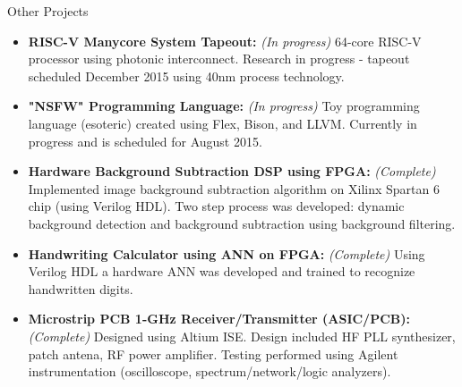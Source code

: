\begin{rSection}{Other Projects}
  \begin{itemize}
  \item {\bf RISC-V Manycore System Tapeout:} {\it (In progress)} 64-core RISC-V processor using photonic interconnect. Research in progress - tapeout scheduled December 2015 using 40nm process technology.
  \item {\bf "NSFW" Programming Language:} {\it (In progress)} Toy programming language (esoteric) created using Flex, Bison, and LLVM. Currently in progress and is scheduled for August 2015.
  \item {\bf Hardware Background Subtraction DSP using FPGA:} {\it (Complete)} Implemented image background subtraction algorithm on Xilinx Spartan 6 chip (using Verilog HDL). Two step process was developed: dynamic background detection and background subtraction using background filtering.
  \item {\bf Handwriting Calculator using ANN on FPGA:} {\it (Complete)} Using Verilog HDL a hardware ANN was developed and trained to recognize handwritten digits.
  \item {\bf Microstrip PCB 1-GHz Receiver/Transmitter (ASIC/PCB):} {\it (Complete)} Designed using Altium ISE. Design included HF PLL synthesizer, patch antena, RF power amplifier. Testing performed using Agilent instrumentation (oscilloscope, spectrum/network/logic analyzers).
  \end{itemize}
\end{rSection}
